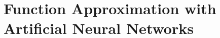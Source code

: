 



% 

\section{Function Approximation with Artificial Neural Networks}
\label{section:Function Approximation with Artificial Neural Networks}

